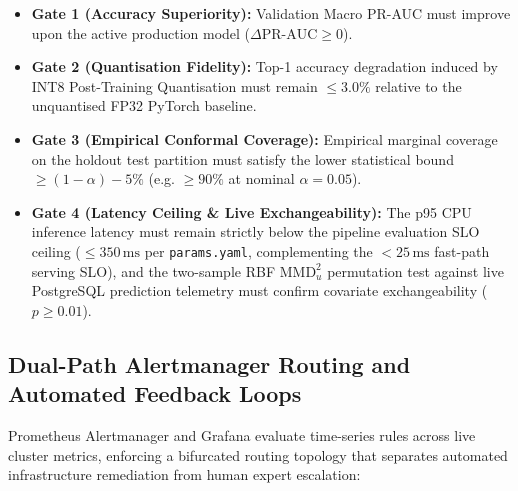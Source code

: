 \begin{enumerate}
    \begin{itemize}
        \item \textbf{Gate 1 (Accuracy Superiority):} Validation Macro PR-AUC must improve upon the active production model ($\Delta \text{PR-AUC} \ge 0$).
        \item \textbf{Gate 2 (Quantisation Fidelity):} Top-1 accuracy degradation induced by INT8 Post-Training Quantisation must remain $\le 3.0\%$ relative to the unquantised FP32 PyTorch baseline.
        \item \textbf{Gate 3 (Empirical Conformal Coverage):} Empirical marginal coverage on the holdout test partition must satisfy the lower statistical bound $\ge (1 - \alpha) - 5\%$ (e.g. $\ge 90\%$ at nominal $\alpha = 0.05$).
        \item \textbf{Gate 4 (Latency Ceiling \& Live Exchangeability):} The p95 CPU inference latency must remain strictly below the pipeline evaluation SLO ceiling ($\le 350\,\text{ms}$ per \nolinkurl{params.yaml}, complementing the $< 25\,\text{ms}$ fast-path serving SLO), and the two-sample RBF $\text{MMD}_u^2$ permutation test against live PostgreSQL prediction telemetry must confirm covariate exchangeability ($p \ge 0.01$).
    \end{itemize}
\end{enumerate}

\subsection{Dual-Path Alertmanager Routing and Automated Feedback Loops}
\label{sec:alertmanager_routing}

Prometheus Alertmanager and Grafana evaluate time-series rules across live cluster metrics, enforcing a bifurcated routing topology that separates automated infrastructure remediation from human expert escalation:

